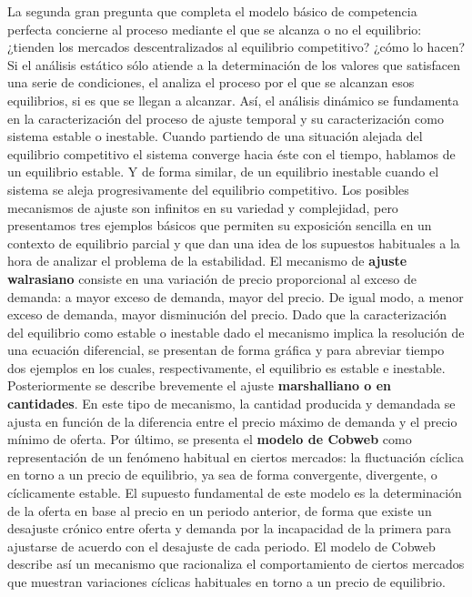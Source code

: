\documentclass{nuevotema}
\begin{document}
La segunda gran pregunta que completa el modelo básico de competencia perfecta concierne al proceso mediante el que se alcanza o no el equilibrio: {¿tienden los mercados descentralizados al equilibrio competitivo?} {¿cómo lo hacen?} Si el análisis estático sólo atiende a la determinación de los valores que satisfacen una serie de condiciones, el  analiza el proceso por el que se alcanzan esos equilibrios, si es que se llegan a alcanzar. Así, el análisis dinámico se fundamenta en la caracterización del proceso de ajuste temporal y su caracterización como sistema estable o inestable. Cuando partiendo de una situación alejada del equilibrio competitivo el sistema converge hacia éste con el tiempo, hablamos de un equilibrio estable. Y de forma similar, de un equilibrio inestable cuando el sistema se aleja progresivamente del equilibrio competitivo. Los posibles mecanismos de ajuste son infinitos en su variedad y complejidad, pero presentamos tres ejemplos básicos que permiten su exposición sencilla en un contexto de equilibrio parcial y que dan una idea de los supuestos habituales a la hora de analizar el problema de la estabilidad. El mecanismo de \textbf{ajuste walrasiano} consiste en una variación de precio proporcional al exceso de demanda: a mayor exceso de demanda, mayor del precio. De igual modo, a menor exceso de demanda, mayor disminución del precio. Dado que la caracterización del equilibrio como estable o inestable dado el mecanismo implica la resolución de una ecuación diferencial, se presentan de forma gráfica y para abreviar tiempo dos ejemplos en los cuales, respectivamente, el equilibrio es estable e inestable. Posteriormente se describe brevemente el ajuste \textbf{marshalliano o en cantidades}. En este tipo de mecanismo, la cantidad producida y demandada se ajusta en función de la diferencia entre el precio máximo de demanda y el precio mínimo de oferta. Por último, se presenta el \textbf{modelo de Cobweb} como representación de un fenómeno habitual en ciertos mercados: la fluctuación cíclica en torno a un precio de equilibrio, ya sea de forma convergente, divergente, o cíclicamente estable. El supuesto fundamental de este modelo es la determinación de la oferta en base al precio en un periodo anterior, de forma que existe un desajuste crónico entre oferta y demanda por la incapacidad de la primera para ajustarse de acuerdo con el desajuste de cada periodo. El modelo de Cobweb describe así un mecanismo que racionaliza el comportamiento de ciertos mercados que muestran variaciones cíclicas habituales en torno a un precio de equilibrio.
\end{document}
